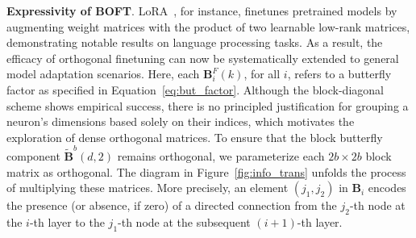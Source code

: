 \textbf{Expressivity of BOFT}. LoRA~\cite{hulora2022}, for instance, finetunes pretrained models by augmenting weight matrices with the product of two learnable low-rank matrices, demonstrating notable results on language processing tasks. As a result, the efficacy of orthogonal finetuning can now be systematically extended to general model adaptation scenarios. Here, each $\bm{B}^F_i(k)$, for all $i$, refers to a butterfly factor as specified in Equation~\ref{eq:but_factor}. Although the block-diagonal scheme shows empirical success, there is no principled justification for grouping a neuron's dimensions based solely on their indices, which motivates the exploration of dense orthogonal matrices. To ensure that the block butterfly component $\tilde{\bm{B}}^b(d,2)$ remains orthogonal, we parameterize each $2b \times 2b$ block matrix as orthogonal. The diagram in Figure~\ref{fig:info_trans} unfolds the process of multiplying these matrices. More precisely, an element $(j_1,j_2)$ in $\bm{B}_i$ encodes the presence (or absence, if zero) of a directed connection from the $j_2$-th node at the $i$-th layer to the $j_1$-th node at the subsequent $(i+1)$-th layer. 
